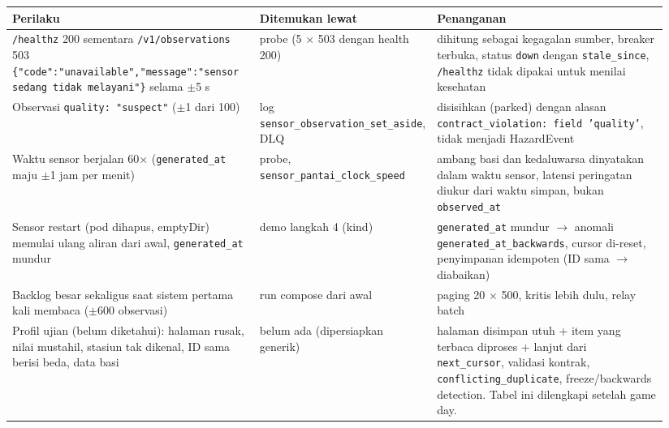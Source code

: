 {\small
\begin{longtable}{@{}>{\raggedright\arraybackslash}p{0.387\linewidth}>{\raggedright\arraybackslash}p{0.161\linewidth}>{\raggedright\arraybackslash}p{0.387\linewidth}@{}}
\toprule
\textbf{Perilaku} & \textbf{Ditemukan lewat} & \textbf{Penanganan} \\
\midrule
\endhead
\texttt{/\allowbreak{}healthz} 200 sementara \texttt{/\allowbreak{}v1/\allowbreak{}observations} 503 \texttt{\{"code":"unavailable",\allowbreak{}"message":"sensor sedang tidak melayani"\}} selama $\pm$5 s & probe (5 $\times$ 503 dengan health 200) & 503 dihitung sebagai kegagalan sumber, breaker terbuka, status \texttt{down} dengan \texttt{stale\_\allowbreak{}since}, \texttt{/\allowbreak{}healthz} tidak dipakai untuk menilai kesehatan \\
Observasi \texttt{quality: "suspect"} ($\pm$1 dari 100) & log \texttt{sensor\_\allowbreak{}observation\_\allowbreak{}set\_\allowbreak{}aside}, DLQ & disisihkan (parked) dengan alasan \texttt{contract\_\allowbreak{}violation: field 'quality'}, tidak menjadi HazardEvent \\
Waktu sensor berjalan 60$\times$ (\texttt{generated\_\allowbreak{}at} maju $\pm$1 jam per menit) & probe, \texttt{sensor\_\allowbreak{}pantai\_\allowbreak{}clock\_\allowbreak{}speed} & ambang basi dan kedaluwarsa dinyatakan dalam waktu sensor, latensi peringatan diukur dari waktu simpan, bukan \texttt{observed\_\allowbreak{}at} \\
Sensor restart (pod dihapus, emptyDir) memulai ulang aliran dari awal, \texttt{generated\_\allowbreak{}at} mundur & demo langkah 4 (kind) & \texttt{generated\_\allowbreak{}at} mundur $\rightarrow$ anomali \texttt{generated\_\allowbreak{}at\_\allowbreak{}backwards}, cursor di-reset, penyimpanan idempoten (ID sama $\rightarrow$ diabaikan) \\
Backlog besar sekaligus saat sistem pertama kali membaca ($\pm$600 observasi) & run compose dari awal & paging 20 $\times$ 500, kritis lebih dulu, relay batch \\
Profil ujian (belum diketahui): halaman rusak, nilai mustahil, stasiun tak dikenal, ID sama berisi beda, data basi & belum ada (dipersiapkan generik) & halaman disimpan utuh + item yang terbaca diproses + lanjut dari \texttt{next\_\allowbreak{}cursor}, validasi kontrak, \texttt{conflicting\_\allowbreak{}duplicate}, freeze/backwards detection. Tabel ini dilengkapi setelah game day. \\
\bottomrule
\end{longtable}
}

